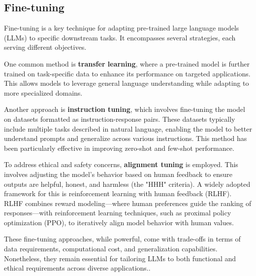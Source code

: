 \subsection{Fine-tuning }
Fine-tuning is a key technique for adapting pre-trained large language models (LLMs) to specific downstream tasks. It encompasses several strategies, each serving different objectives. 

One common method is \textbf{transfer learning}, where a pre-trained model is further trained on task-specific data to enhance its performance on targeted applications. This allows models to leverage general language understanding while adapting to more specialized domains.

Another approach is \textbf{instruction tuning}, which involves fine-tuning the model on datasets formatted as instruction-response pairs. These datasets typically include multiple tasks described in natural language, enabling the model to better understand prompts and generalize across various instructions. This method has been particularly effective in improving zero-shot and few-shot performance.

To address ethical and safety concerns, \textbf{alignment tuning} is employed. This involves adjusting the model’s behavior based on human feedback to ensure outputs are helpful, honest, and harmless (the "HHH" criteria). A widely adopted framework for this is reinforcement learning with human feedback (RLHF). RLHF combines reward modeling—where human preferences guide the ranking of responses—with reinforcement learning techniques, such as proximal policy optimization (PPO), to iteratively align model behavior with human values.

These fine-tuning approaches, while powerful, come with trade-offs in terms of data requirements, computational cost, and generalization capabilities. Nonetheless, they remain essential for tailoring LLMs to both functional and ethical requirements across diverse applications.\cite{touvron2023llama}.
